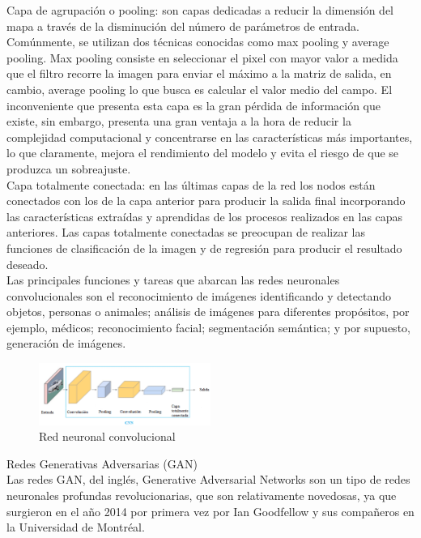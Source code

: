 Capa de agrupación o pooling: son capas dedicadas a reducir la dimensión del mapa a través de la disminución del número de parámetros de entrada.\\

Comúnmente, se utilizan dos técnicas conocidas como max pooling y average pooling. Max pooling consiste en seleccionar el pixel con mayor valor a medida que el filtro recorre la imagen para enviar el máximo a la matriz de salida, en cambio, average pooling lo que busca es calcular el valor medio del campo. El inconveniente que presenta esta capa es la gran pérdida de información que existe, sin embargo, presenta una gran ventaja a la hora de reducir la complejidad computacional y concentrarse en las características más importantes, lo que claramente, mejora el rendimiento del modelo y evita el riesgo de que se produzca un sobreajuste.\\

Capa totalmente conectada: en las últimas capas de la red los nodos están conectados con los de la capa anterior para producir la salida final incorporando las características extraídas y aprendidas de los procesos realizados en las capas anteriores. Las capas totalmente conectadas se preocupan de realizar las funciones de clasificación de la imagen y de regresión para producir el resultado deseado. \\

Las principales funciones y tareas que abarcan las redes neuronales convolucionales son el reconocimiento de imágenes identificando y detectando objetos, personas o animales; análisis de imágenes para diferentes propósitos, por ejemplo, médicos; reconocimiento facial; segmentación semántica; y por supuesto, generación de imágenes.\\
\begin{figure}[h]
	\centering
	\includegraphics[width = 0.5\textwidth]{Imagenes/Vectorial/cnn.png}
	\caption{Red neuronal convolucional}
	\label{fig:sampleImage}
\end{figure}

Redes Generativas Adversarias (GAN)\\

Las redes GAN, del inglés, Generative Adversarial Networks son un tipo de redes neuronales profundas revolucionarias, que son relativamente novedosas, ya que surgieron en el año 2014 por primera vez por Ian Goodfellow y sus compañeros en la Universidad de Montréal. \\

